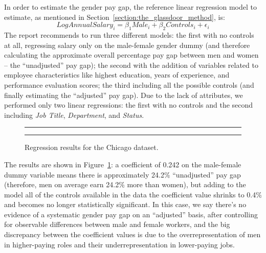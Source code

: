In order to estimate the gender pay gap, the reference linear regression model to estimate, as mentioned in Section~\ref{section:the_glassdoor_method}, is: \[\mathit{Log Annual Salary}_i = \beta_1\textit{Male}_i + \beta_2\mathit{Controls}_i + \epsilon_i\]
The report recommends to run three different models: the first with no controls at all, regressing salary only on the male-female gender dummy (and therefore calculating the approximate overall percentage pay gap between men and women -- the ``unadjusted'' pay gap); the second with the addition of variables related to employee characteristics like highest education, years of experience, and performance evaluation scores; the third including all the possible controls (and finally estimating the ``adjusted'' pay gap). Due to the lack of attributes, we performed only two linear regressions: the first with no controls and the second including \textit{Job Title}, \textit{Department}, and \textit{Status}.

\begin{figure}[h!]
\centering
\noindent\rule{\linewidth}{0.4pt}\par
\noindent\rule{\linewidth}{0.4pt}
\caption{Regression results for the Chicago dataset.}
\label{fig:chicago_glassdoor2}
\end{figure}

The results are shown in Figure~\ref{fig:chicago_glassdoor2}: a coefficient of 0.242 on the male-female dummy variable means there is approximately 24.2\% ``unadjusted'' pay gap (therefore, men on average earn 24.2\% more than women), but adding to the model all of the controls available in the data the coefficient value shrinks to 0.4\% and becomes no longer statistically significant. In this case, we say there's no evidence of a systematic gender pay gap on an ``adjusted'' basis, after controlling for observable differences between male and female workers, and the big discrepancy between the coefficient values is due to the overrepresentation of men in higher-paying roles and their underrepresentation in lower-paying jobs.


